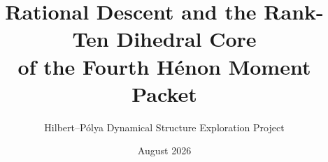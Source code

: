 \documentclass[11pt]{article}
\title{Rational Descent and the Rank-Ten Dihedral Core\\
of the Fourth H\'enon Moment Packet}
\author{Hilbert--P\'olya Dynamical Structure Exploration Project}
\date{August 2026}
\theoremstyle{definition}
\theoremstyle{remark}
\begin{document}
\maketitle











\appendix


\begingroup
\raggedright


\endgroup
\end{document}
